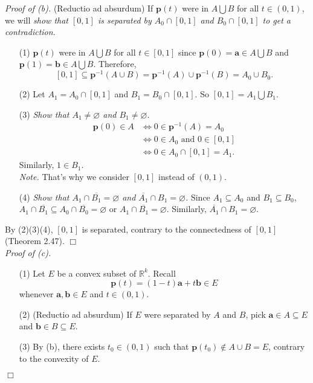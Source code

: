 \documentclass{article}
\begin{document}
\emph{Proof of (b).}
(Reductio ad absurdum)
If $\mathbf{p}(t)$ were in $A \bigcup B$ for all $t \in (0,1)$,
we will \emph{show that $[0,1]$ is separated by $A_0 \cap [0,1]$ and $B_0 \cap [0,1]$
to get a contradiction.}
\begin{enumerate}
\item[(1)]
  $\mathbf{p}(t)$ were in $A \bigcup B$ for all $t \in [0,1]$
  since
  $\mathbf{p}(0) = \mathbf{a} \in A \bigcup B$
  and
  $\mathbf{p}(1) = \mathbf{b} \in A \bigcup B$.
  Therefore,
  $$[0,1]
  \subseteq \mathbf{p}^{-1}(A \cup B)
  = \mathbf{p}^{-1}(A) \cup \mathbf{p}^{-1}(B)
  = A_0 \cup B_0.$$
\item[(2)]
  Let $A_1 = A_0 \cap [0,1]$ and $B_1 = B_0 \cap [0,1]$.
  So $[0,1] = A_1 \bigcup B_1$.
\item[(3)]
  \emph{Show that $A_1 \neq \varnothing$ and $B_1 \neq \varnothing$.}
  \begin{align*}
  \mathbf{p}(0) \in A
  &\Longleftrightarrow 0 \in \mathbf{p}^{-1}(A) = A_0 \\
  &\Longleftrightarrow 0 \in A_0 \text{ and } 0 \in [0,1] \\
  &\Longleftrightarrow 0 \in A_0 \cap [0,1] = A_1.
  \end{align*}
  Similarly, $1 \in B_1$. \\

  \emph{Note.} That's why we consider $[0,1]$ instead of $(0,1)$.
\item[(4)]
  \emph{Show that $A_1 \cap \overline{B_1} = \varnothing$
  and $\overline{A_1} \cap B_1 = \varnothing$.}
  Since $A_1 \subseteq A_0$ and $B_1 \subseteq B_0$,
  $A_1 \cap \overline{B_1} \subseteq A_0 \cap \overline{B_0} = \varnothing$
  or $A_1 \cap \overline{B_1} = \varnothing$.
  Similarly, $\overline{A_1} \cap B_1 = \varnothing$.
\end{enumerate}
By (2)(3)(4), $[0,1]$ is separated, contrary to the connectedness of $[0,1]$
(Theorem 2.47).
$\Box$ \\

\emph{Proof of (c).}
\begin{enumerate}
\item[(1)]
Let $E$ be a convex subset of $\mathbb{R}^k$.
Recall
$$\mathbf{p}(t) = (1-t)\mathbf{a} + t\mathbf{b} \in E$$
whenever $\mathbf{a}, \mathbf{b} \in E$ and $t \in (0,1)$.
\item[(2)]
(Reductio ad absurdum)
If $E$ were separated by $A$ and $B$, pick $\mathbf{a} \in A \subseteq E$
and $\mathbf{b} \in B \subseteq E$.
\item[(3)]
By (b), there exists $t_0 \in (0,1)$ such that $\mathbf{p}(t_0) \not\in A \cup B = E$,
contrary to the convexity of $E$.
\end{enumerate}
$\Box$ \\\\
\end{document}
